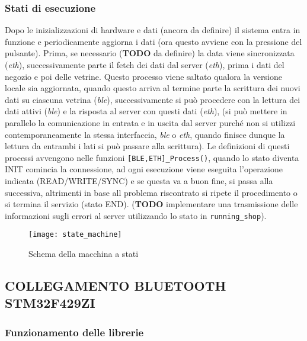 \subsubsection{Stati di esecuzione}


Dopo le inizializzazioni di hardware e dati (ancora da definire) il sistema entra in funzione e periodicamente aggiorna i dati (ora questo avviene con la pressione del pulsante). Prima, se necessario (\textbf{TODO} da definire) la data viene sincronizzata (\textit{eth}), successivamente parte il fetch dei dati dal server (\textit{eth}), prima i dati del negozio e poi delle vetrine. Questo processo viene saltato qualora la versione locale sia aggiornata, quando questo arriva al termine parte la scrittura dei nuovi dati su ciascuna vetrina (\textit{ble}), successivamente si pu\`o procedere con la lettura dei dati attivi (\textit{ble}) e la risposta al server con questi dati (\textit{eth}), (si pu\`o mettere in parallelo la comunicazione in entrata e in uscita dal server purch\'e non si utilizzi contemporaneamente la stessa interfaccia, \textit{ble} o \textit{eth}, quando finisce dunque la lettura da entrambi i lati si pu\`o passare alla scrittura). Le definizioni di questi processi avvengono nelle funzioni \texttt{[BLE,ETH]\_Process()}, quando lo stato diventa INIT comincia la connessione, ad ogni esecuzione viene eseguita l'operazione indicata (READ/WRITE/SYNC) e se questa va a buon fine, si passa alla successiva, altrimenti in base all problema riscontrato si ripete il procedimento o si termina il servizio (stato END). (\textbf{TODO} implementare una trasmissione delle informazioni sugli errori al server utilizzando lo stato in \texttt{running\_shop}). 

\begin{figure}[h!]
	\texttt{[image: state\_machine]}
  \caption{Schema della macchina a stati}
\end{figure}

\subsection{COLLEGAMENTO BLUETOOTH STM32F429ZI}

\subsubsection{Funzionamento delle librerie}

